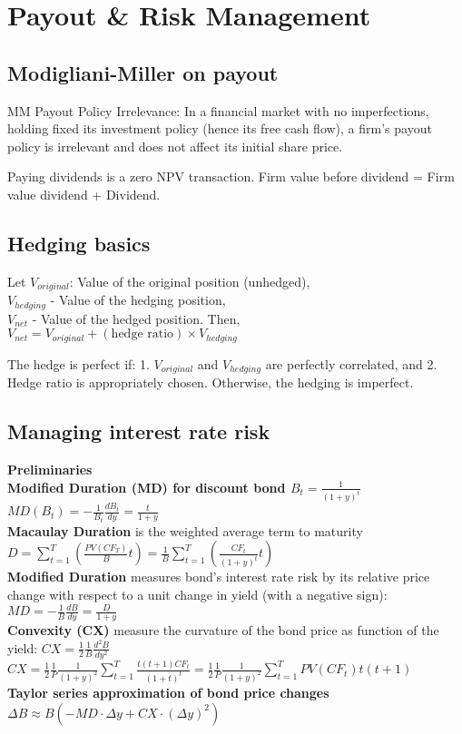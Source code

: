 \section{Payout \& Risk Management}

\subsection*{Modigliani-Miller on payout}

MM Payout Policy Irrelevance: In a financial market with no imperfections,
holding fixed its investment policy (hence its free cash flow), a firm's payout
policy is irrelevant and does not affect its initial share price.

Paying dividends is a zero NPV transaction. Firm value before dividend = Firm value dividend + Dividend.


\subsection*{Hedging basics}

Let $V_{original}$: Value of the original position (unhedged), \\
$V_{hedging}$ - Value of the hedging position, \\
$V_{net}$ -  Value of the hedged position.
Then, \\
$V_{net} = V_{original} + (\text{hedge ratio}) \times V_{hedging} $

The hedge is perfect if: 1. $V_{original}$ and $V_{hedging}$ are perfectly correlated, and 2. Hedge ratio is appropriately chosen.
Otherwise, the hedging is imperfect.


\subsection*{Managing interest rate risk}

{\bf Preliminaries } \\
	 {\bf Modified Duration (MD) for discount bond $ B_t=\frac{1}{(1+y)^t} $ } $ MD(B_t) = -\frac{1}{B_t}\frac{dB_t}{dy} = \frac{t}{1+y}$  \\
	 {\bf Macaulay Duration} is the weighted average term to maturity  $ D = \sum_{t=1}^{T} \left(   \frac{PV(CF_T)}{B}  t \right)  =   \frac{1}{B}\sum_{t=1}^{T} \left(  \frac{CF_t}{(1+y)^t} t \right)  $ \\
	 {\bf Modified Duration} measures bond's interest rate risk by its relative price change with respect
	to a unit change in yield (with a negative sign):  $ MD =  -\frac{1}{B}\frac{dB}{dy}  = \frac{D}{1+y}  $ \\
	 {\bf Convexity (CX)} measure the curvature of the bond price as function of the yield:  $ CX =  \frac{1}{2}\frac{1}{B}\frac{d^2B}{dy^2}  $ \\
	$ CX = \frac{1}{2} \frac{1}{P} \frac{1}{(1+y)^2} \sum_{t=1}^{T} \frac{t (t+1) CF_t}{(1+t)^t} =  \frac{1}{2} \frac{1}{P} \frac{1}{(1+y)^2} \sum_{t=1}^{T} PV(CF_t) t (t+1)  $ \\
	 {\bf Taylor series approximation of bond price changes}  $ \Delta B \approx  B \left(  -MD  \cdot \Delta y + CX \cdot ( \Delta y)^2 \right)    $ \\



